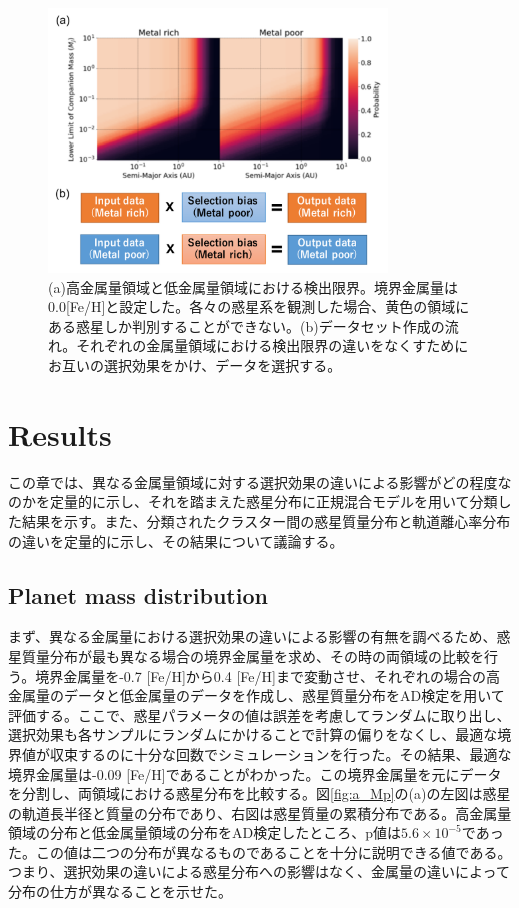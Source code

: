 \documentclass[twocolumn, dvipdfmx]{aastex62}
\begin{document}
\begin{CJK*}{UTF8}{min}
\begin{figure}[H]
\begin{center}
\includegraphics[width=9cm]{../../../Figure/selection_bias.pdf}
\caption{(a)高金属量領域と低金属量領域における検出限界。境界金属量は0.0[Fe/H]と設定した。各々の惑星系を観測した場合、黄色の領域にある惑星しか判別することができない。(b)データセット作成の流れ。それぞれの金属量領域における検出限界の違いをなくすためにお互いの選択効果をかけ、データを選択する。 \label{fig:bias}}
\end{center}
\end{figure}


\section{Results} \label{sec:results}

この章では、異なる金属量領域に対する選択効果の違いによる影響がどの程度なのかを定量的に示し、それを踏まえた惑星分布に正規混合モデルを用いて分類した結果を示す。また、分類されたクラスター間の惑星質量分布と軌道離心率分布の違いを定量的に示し、その結果について議論する。


\subsection{Planet mass distribution} \label{subsec:axis}

まず、異なる金属量における選択効果の違いによる影響の有無を調べるため、惑星質量分布が最も異なる場合の境界金属量を求め、その時の両領域の比較を行う。境界金属量を-0.7 [Fe/H]から0.4 [Fe/H]まで変動させ、それぞれの場合の高金属量のデータと低金属量のデータを作成し、惑星質量分布をAD検定を用いて評価する。ここで、惑星パラメータの値は誤差を考慮してランダムに取り出し、選択効果も各サンプルにランダムにかけることで計算の偏りをなくし、最適な境界値が収束するのに十分な回数でシミュレーションを行った。その結果、最適な境界金属量は-0.09 [Fe/H]であることがわかった。この境界金属量を元にデータを分割し、両領域における惑星分布を比較する。図\ref{fig:a_Mp}の(a)の左図は惑星の軌道長半径と質量の分布であり、右図は惑星質量の累積分布である。高金属量領域の分布と低金属量領域の分布をAD検定したところ、p値は$5.6\times10^{-5}$であった。この値は二つの分布が異なるものであることを十分に説明できる値である。つまり、選択効果の違いによる惑星分布への影響はなく、金属量の違いによって分布の仕方が異なることを示せた。


\end{CJK*}
\end{document}
